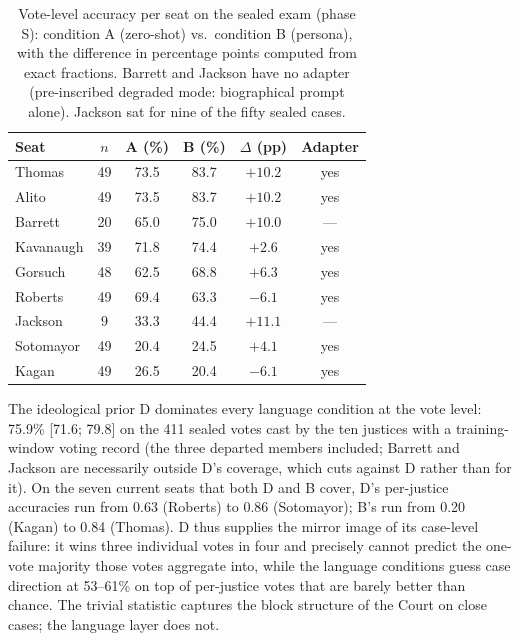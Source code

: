\begin{table}[t]
\centering
\caption{Vote-level accuracy per seat on the sealed exam (phase S):
condition A (zero-shot) vs.\ condition B (persona), with the
difference in percentage points computed from exact fractions.
Barrett and Jackson have no adapter (pre-inscribed degraded mode:
biographical prompt alone). Jackson sat for nine of the fifty sealed
cases.}
\label{tab:votes-per-justice}
\small
\begin{tabular}{@{}lccccc@{}}
\toprule
Seat & $n$ & A (\%) & B (\%) & $\Delta$ (pp) & Adapter \\
\midrule
Thomas & 49 & 73.5 & 83.7 & $+10.2$ & yes \\
Alito & 49 & 73.5 & 83.7 & $+10.2$ & yes \\
Barrett & 20 & 65.0 & 75.0 & $+10.0$ & --- \\
Kavanaugh & 39 & 71.8 & 74.4 & $+2.6$ & yes \\
Gorsuch & 48 & 62.5 & 68.8 & $+6.3$ & yes \\
Roberts & 49 & 69.4 & 63.3 & $-6.1$ & yes \\
Jackson & 9 & 33.3 & 44.4 & $+11.1$ & --- \\
Sotomayor & 49 & 20.4 & 24.5 & $+4.1$ & yes \\
Kagan & 49 & 26.5 & 20.4 & $-6.1$ & yes \\
\bottomrule
\end{tabular}
\end{table}

The ideological prior D dominates every language condition at the
vote level: 75.9\% [71.6; 79.8] on the 411 sealed votes cast by the
ten justices with a training-window voting record (the three departed
members included; Barrett and Jackson are necessarily outside D's
coverage, which cuts against D rather than for it). On the seven
current seats that both D and B cover, D's per-justice accuracies run
from 0.63 (Roberts) to 0.86 (Sotomayor); B's run from 0.20 (Kagan) to
0.84 (Thomas). D thus supplies the mirror image of its case-level
failure: it wins three individual votes in four and precisely cannot
predict the one-vote majority those votes aggregate into, while the
language conditions guess case direction at 53--61\% on top of
per-justice votes that are barely better than chance. The trivial
statistic captures the block structure of the Court on close cases;
the language layer does not.


